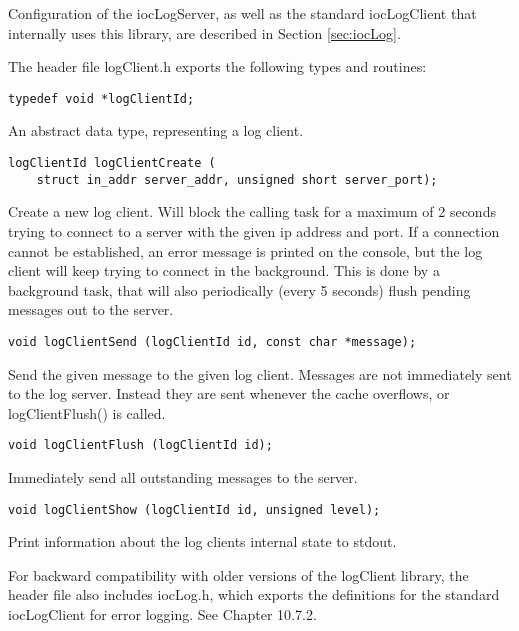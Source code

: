 Configuration of the iocLogServer, as well as the standard iocLogClient that internally uses this library, are described in Section \ref{sec:iocLog}.

The header file logClient.h exports the following types and routines:

\begin{verbatim}
typedef void *logClientId;
\end{verbatim}

An abstract data type, representing a log client.

\begin{verbatim}
logClientId logClientCreate (
    struct in_addr server_addr, unsigned short server_port);
\end{verbatim}

Create a new log client.
Will block the calling task for a maximum of 2 seconds trying to connect to a server with the given ip address and port.
If a connection cannot be established, an error message is printed on the console, but the log client will keep trying to connect in the background.
This is done by a background task, that will also periodically (every 5 seconds) flush pending messages out to the server.

\begin{verbatim}
void logClientSend (logClientId id, const char *message);
\end{verbatim}

Send the given message to the given log client.
Messages are not immediately sent to the log server.
Instead they are sent whenever the cache overflows, or logClientFlush() is called.

\begin{verbatim}
void logClientFlush (logClientId id);
\end{verbatim}

Immediately send all outstanding messages to the server.

\begin{verbatim}
void logClientShow (logClientId id, unsigned level);
\end{verbatim}

Print information about the log clients internal state to stdout.

For backward compatibility with older versions of the logClient library, the header file also includes iocLog.h, which exports the definitions for the standard iocLogClient for error logging.
See Chapter 10.7.2.

